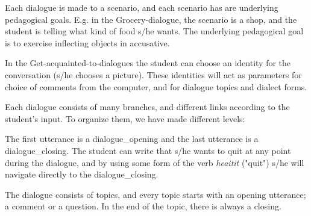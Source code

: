 \documentclass[11pt]{article}
\begin{document}
Each dialogue is made to a scenario, and each scenario has are underlying pedagogical goals. E.g. in the Grocery-dialogue, the scenario is a shop, and the student is telling what kind of food s/he wants. The underlying pedagogical goal is to exercise inflecting objects in accusative.


In the Get-acquainted-to-dialogues the student can choose an identity for the conversation (s/he chooses a picture). These identities will act as parameters for choice of comments from the computer, and for dialogue topics and dialect forms.

%	


Each dialogue consists of many branches, and different links according to the student's input. To organize them, we have made different levels:

The first utterance is a dialogue\_opening and the last utterance is a dialogue\_closing. The student can write that s/he wants to quit at any point during the dialogue, and by using some form of the verb \textit{heaitit} ("quit") s/he will navigate directly to the dialogue\_closing.

The dialogue consists of topics, and every topic starts with an opening utterance; a comment or a question. In the end of the topic, there is always a closing.  
\end{document}
